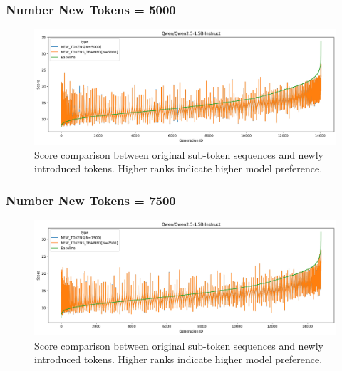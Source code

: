 \subsubsection{Number New Tokens = 5000}
\begin{figure}[H]
    \centering
    \includegraphics[width=\textwidth]{Figures/Appendix/token-rank-comparison_5000_qwen.png}
    \caption[Score comparison for \textit{Qwen2.5-1.5B-Instruct} w/ 5000 new tokens]{Score comparison between original sub-token sequences and newly introduced tokens. Higher ranks indicate higher model preference.}
    \label{annex:fig:new_token_rank:5000_qwen}
\end{figure}
\FloatBarrier

\subsubsection{Number New Tokens = 7500}
\begin{figure}[H]
    \centering
    \includegraphics[width=\textwidth]{Figures/Appendix/token-rank-comparison_7500_qwen.png}
    \caption[Score comparison for \textit{Qwen2.5-1.5B-Instruct} w/ 7500 new tokens]{Score comparison between original sub-token sequences and newly introduced tokens. Higher ranks indicate higher model preference.}
    \label{annex:fig:new_token_rank:7500_qwen}
\end{figure}
\FloatBarrier


